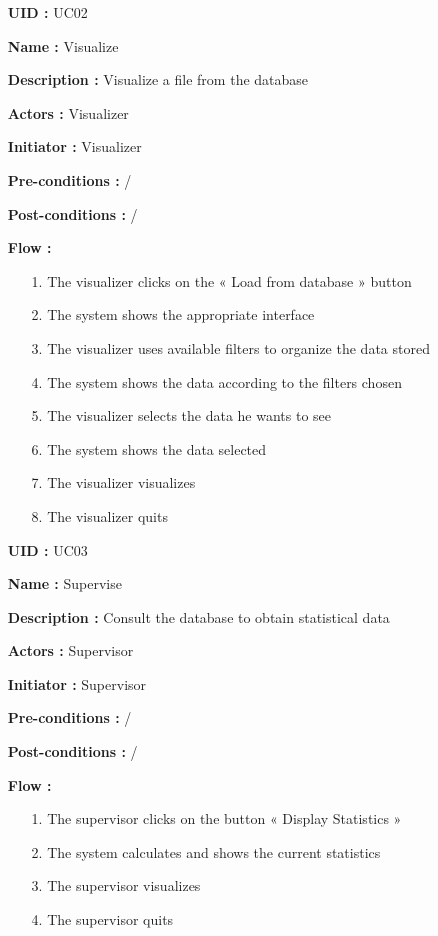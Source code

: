 \begin{enumerate}	
	\item[{\bf UID :}] UC02
	\item[{\bf Name :}] Visualize
	\item[{\bf Description :}]  Visualize a file from the database
	\item[{\bf Actors :}] Visualizer
	\item[{\bf Initiator :}] Visualizer
	\item[{\bf Pre-conditions :}] / 
	\item[{\bf Post-conditions :}] /
	\item[{\bf Flow :}]
	\begin{itemize} 
		\item[{1.}]	The visualizer clicks on the « Load from database » button
		\item[{2.}]	The system shows the appropriate interface
		\item[{3.}]	The visualizer uses available filters to organize the data stored
		\item[{4.}]	The system shows the data according to the filters chosen
		\item[{5.}]	The visualizer selects the data he wants to see 
		\item[{6.}]	The system shows the data selected
		\item[{7.}]	The visualizer visualizes
		\item[{8.}]	The visualizer quits
	\end{itemize}
\end{enumerate}

\bigbreak

\begin{enumerate}
	\item[{\bf UID :}] UC03
	\item[{\bf Name :}] Supervise
	\item[{\bf Description :}]  Consult the database to obtain statistical data
	\item[{\bf Actors :}] Supervisor
	\item[{\bf Initiator :}] Supervisor
	\item[{\bf Pre-conditions :}] / 
	\item[{\bf Post-conditions :}] /
	\item[{\bf Flow :}]
	\begin{itemize} 
		\item[{1.}]	The supervisor clicks on the button « Display Statistics »
		\item[{2.}]	The system calculates and shows the current statistics
		\item[{3.}]	The supervisor visualizes
		\item[{4.}]	The supervisor quits
	\end{itemize}
\end{enumerate}

